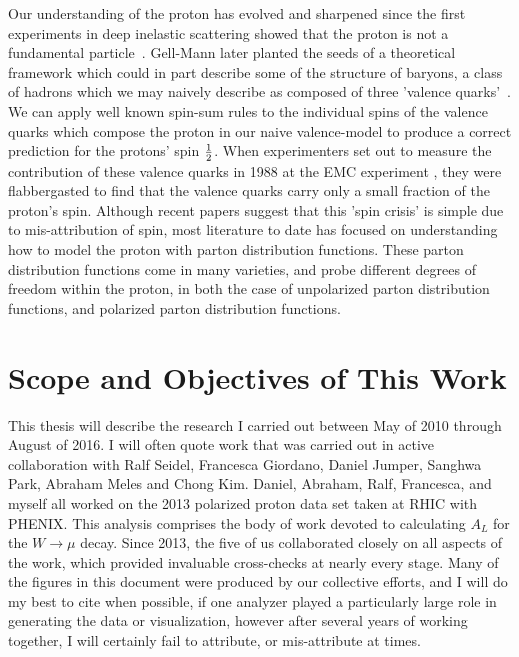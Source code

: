 Our understanding of the proton has evolved and sharpened since the first
experiments in deep inelastic scattering showed that the proton is not a
fundamental particle~\cite{Breidenbach1969}. Gell-Mann later planted the seeds
of a theoretical framework which could in part describe some of the structure of
baryons, a class of hadrons which we may naively describe as composed of three
'valence quarks'~\cite{Bjorken1969}. We can apply well known spin-sum rules to the
individual spins of the valence quarks which compose the proton in our naive
valence-model to produce a correct prediction for the protons' spin
${1}\over{2}$. When experimenters set out to measure the contribution of these
valence quarks in 1988 at the EMC experiment \cite{Ashman1988}, they were
flabbergasted to find that the valence quarks carry only a small fraction of the
proton's spin. Although recent papers \cite{Povh2016} suggest that this 'spin
crisis' is simple due to mis-attribution of spin, most literature to date has
focused on understanding how to model the proton with parton distribution
functions. These parton distribution functions come in many varieties, and probe
different degrees of freedom within the proton, in both the case of unpolarized
parton distribution functions, and polarized parton distribution functions. \\
 
\section{Scope and Objectives of This Work} This thesis will describe the
research I carried out between May of 2010 through August of 2016. I will often
quote work that was carried out in active collaboration with Ralf Seidel,
Francesca Giordano, Daniel Jumper, Sanghwa Park, Abraham Meles and Chong Kim.
Daniel, Abraham, Ralf, Francesca, and myself all worked on the 2013 polarized
proton data set taken at RHIC with PHENIX. This analysis comprises the body of
work devoted to calculating $A_L$ for the $W\rightarrow\mu$ decay. Since 2013,
the five of us collaborated closely on all aspects of the work, which provided
invaluable cross-checks at nearly every stage. Many of the figures in this
document were produced by our collective efforts, and I will do my best to cite
when possible, if one analyzer played a particularly large role in generating
the data or visualization, however after several years of working together, I
will certainly fail to attribute, or mis-attribute at times.

